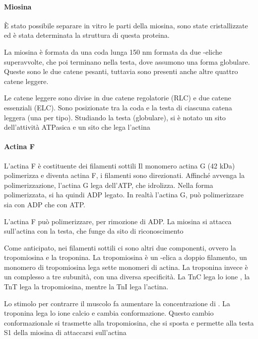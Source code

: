 \paragraph{Miosina}

È stato possibile separare in vitro le parti della miosina, sono state cristallizzate ed è stata determinata la struttura di questa proteina.

La miosina è formata da una coda lunga 150 nm formata da due \alpha-eliche superavvolte, che poi terminano nella testa, dove assumono una forma globulare.
Queste sono le due catene pesanti, tuttavia sono presenti anche altre quattro catene leggere.

Le catene leggere sono divise in due catene regolatorie (RLC) e due catene essenziali (ELC).
Sono posizionate tra la coda e la testa di ciascuna catena leggera (una per tipo).
Studiando la testa (globulare), si è notato un sito dell'attività ATPasica e un sito che lega l'actina


\paragraph{Actina F}

L'actina F è costituente dei filamenti sottili
Il monomero actina G (42 kDa) polimerizza e diventa actina F, i filamenti sono direzionati.
Affinché avvenga la polimerizzazione, l'actina G lega dell'ATP, che idrolizza. Nella forma polimerizzata, si ha quindi ADP legato. In realtà l'actina G, può polimerizzare sia con ADP che con ATP.{}

L'actina F può polimerizzare, per rimozione di ADP.{}
La miosina si attacca sull'actina con la testa, che funge da sito di riconoscimento


Come anticipato, nei filamenti sottili ci sono altri due componenti, ovvero la tropomiosina e la troponina. La tropomiosina è un \alpha-elica a doppio filamento, un monomero di tropomiosina lega sette monomeri di actina. La troponina invece è un complesso a tre subunità, con una diversa specificità.
La TnC lega lo ione , la TnT lega la tropomiosina, mentre la TnI lega l'actina.

Lo stimolo per contrarre il muscolo fa aumentare la concentrazione di . La troponina lega lo ione calcio e cambia conformazione. Questo cambio conformazionale si trasmette alla tropomiosina, che si sposta e permette alla testa S1 della miosina di attaccarsi sull'actina

